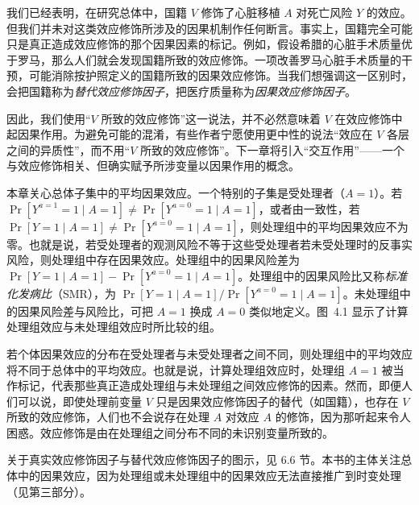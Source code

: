 我们已经表明，在研究总体中，国籍 $V$ 修饰了心脏移植 $A$ 对死亡风险 $Y$ 的效应。但我们并未对这类效应修饰所涉及的因果机制作任何断言。事实上，国籍完全可能只是真正造成效应修饰的那个因果因素的标记。例如，假设希腊的心脏手术质量优于罗马，那么人们就会发现国籍所致的效应修饰。一项改善罗马心脏手术质量的干预，可能消除按护照定义的国籍所致的因果效应修饰。当我们想强调这一区别时，会把国籍称为\emph{替代效应修饰因子}，把医疗质量称为\emph{因果效应修饰因子}。

因此，我们使用“$V$ 所致的效应修饰”这一说法，并不必然意味着 $V$ 在效应修饰中起因果作用。为避免可能的混淆，有些作者宁愿使用更中性的说法“效应在 $V$ 各层之间的异质性”，而不用“$V$ 所致的效应修饰”。下一章将引入“交互作用”——一个与效应修饰相关、但确实赋予所涉变量以因果作用的概念。

\begin{finepoint}[处理组中的效应]
本章关心总体子集中的平均因果效应。一个特别的子集是受处理者（$A=1$）。若 $\Pr[Y^{a=1}=1\mid A=1]\neq\Pr[Y^{a=0}=1\mid A=1]$，或者由一致性，若 $\Pr[Y=1\mid A=1]\neq\Pr[Y^{a=0}=1\mid A=1]$，则处理组中的平均因果效应不为零。也就是说，若受处理者的观测风险不等于这些受处理者若未受处理时的反事实风险，则处理组中存在因果效应。处理组中的因果风险差为 $\Pr[Y=1\mid A=1]-\Pr[Y^{a=0}=1\mid A=1]$。处理组中的因果风险比又称\emph{标准化发病比}（SMR），为 $\Pr[Y=1\mid A=1]/\Pr[Y^{a=0}=1\mid A=1]$。未处理组中的因果风险差与风险比，可把 $A=1$ 换成 $A=0$ 类似地定义。图~4.1 显示了计算处理组效应与未处理组效应时所比较的组。

若个体因果效应的分布在受处理者与未受处理者之间不同，则处理组中的平均效应将不同于总体中的平均效应。也就是说，计算处理组效应时，处理组 $A=1$ 被当作标记，代表那些真正造成处理组与未处理组之间效应修饰的因素。然而，即便人们可以说，即使处理前变量 $V$ 只是因果效应修饰因子的替代（如国籍），也存在 $V$ 所致的效应修饰，人们也不会说存在处理 $A$ 对效应 $A$ 的修饰，因为那听起来令人困惑。效应修饰是由在处理组之间分布不同的未识别变量所致的。

关于真实效应修饰因子与替代效应修饰因子的图示，见 6.6 节。本书的主体关注总体中的因果效应，因为处理组或未处理组中的因果效应无法直接推广到时变处理（见第三部分）。
\end{finepoint}

